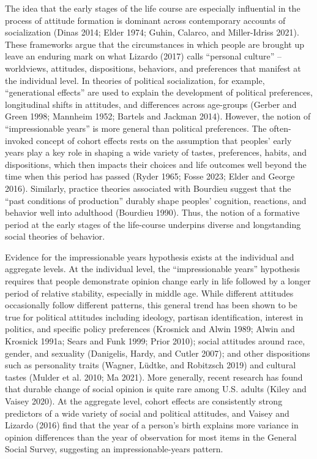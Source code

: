 \documentclass[
  12pt,
]{article}
\begin{document}
The idea that the early stages of the life course are especially influential in the process of attitude formation is dominant across contemporary accounts of socialization (Dinas 2014; Elder 1974; Guhin, Calarco, and Miller-Idriss 2021). These frameworks argue that the circumstances in which people are brought up leave an enduring mark on what Lizardo (2017) calls ``personal culture'' -- worldviews, attitudes, dispositions, behaviors, and preferences that manifest at the individual level. In theories of political socialization, for example, ``generational effects'' are used to explain the development of political preferences, longitudinal shifts in attitudes, and differences across age-groups (Gerber and Green 1998; Mannheim 1952; Bartels and Jackman 2014). However, the notion of ``impressionable years'' is more general than political preferences. The often-invoked concept of cohort effects rests on the assumption that peoples' early years play a key role in shaping a wide variety of tastes, preferences, habits, and dispositions, which then impacts their choices and life outcomes well beyond the time when this period has passed (Ryder 1965; Fosse 2023; Elder and George 2016). Similarly, practice theories associated with Bourdieu suggest that the ``past conditions of production'' durably shape peoples' cognition, reactions, and behavior well into adulthood (Bourdieu 1990). Thus, the notion of a formative period at the early stages of the life-course underpins diverse and longstanding social theories of behavior.

Evidence for the impressionable years hypothesis exists at the individual and aggregate levels. At the individual level, the ``impressionable years'' hypothesis requires that people demonstrate opinion change early in life followed by a longer period of relative stability, especially in middle age. While different attitudes occasionally follow different patterns, this general trend has been shown to be true for political attitudes including ideology, partisan identification, interest in politics, and specific policy preferences (Krosnick and Alwin 1989; Alwin and Krosnick 1991a; Sears and Funk 1999; Prior 2010); social attitudes around race, gender, and sexuality (Danigelis, Hardy, and Cutler 2007); and other dispositions such as personality traits (Wagner, Lüdtke, and Robitzsch 2019) and cultural tastes (Mulder et al. 2010; Ma 2021). More generally, recent research has found that durable change of social opinion is quite rare among U.S. adults (Kiley and Vaisey 2020). At the aggregate level, cohort effects are consistently strong predictors of a wide variety of social and political attitudes, and Vaisey and Lizardo (2016) find that the year of a person's birth explains more variance in opinion differences than the year of observation for most items in the General Social Survey, suggesting an impressionable-years pattern.
\end{document}
